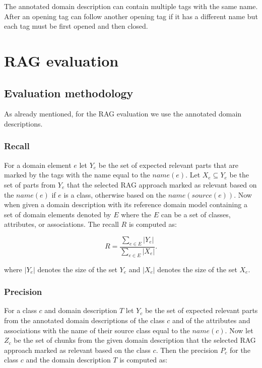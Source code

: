 The annotated domain description can contain multiple tags with the same name. After an opening tag can follow another opening tag if it has a different name but each tag must be first opened and then closed.


\section{RAG evaluation}
\label{sec:filtering_evaluation}

\subsection{Evaluation methodology}

As already mentioned, for the RAG evaluation we use the annotated domain descriptions.

\subsubsection{Recall}

For a domain element $e$ let $Y_e$ be the set of expected relevant parts that are marked by the tags with the name equal to the $name(e)$. Let $X_e \subseteq Y_e$ be the set of parts from $Y_e$ that the selected RAG approach marked as relevant based on the $name(e)$ if $e$ is a class, otherwise based on the $name(source(e))$. Now when given a domain description with its reference domain model containing a set of domain elements denoted by $E$ where the $E$ can be a set of classes, attributes, or associations. The recall $R$ is computed as:

\[ R = \dfrac{\sum_{e \in E}|Y_e|}{\sum_{e \in E}|X_e|}. \]

\noindent{}where $|Y_e|$ denotes the size of the set $Y_e$ and $|X_e|$ denotes the size of the set $X_e$.


\subsubsection{Precision}

For a class $c$ and domain description $T$ let $Y_{c}$ be the set of expected relevant parts from the annotated domain descriptions of the class $c$ and of the attributes and associations with the name of their source class equal to the $name(c)$. Now let $Z_{c}$ be the set of chunks from the given domain description that the selected RAG approach marked as relevant based on the class $c$. Then the precision $P_{c}$ for the class $c$ and the domain description $T$ is computed as:

